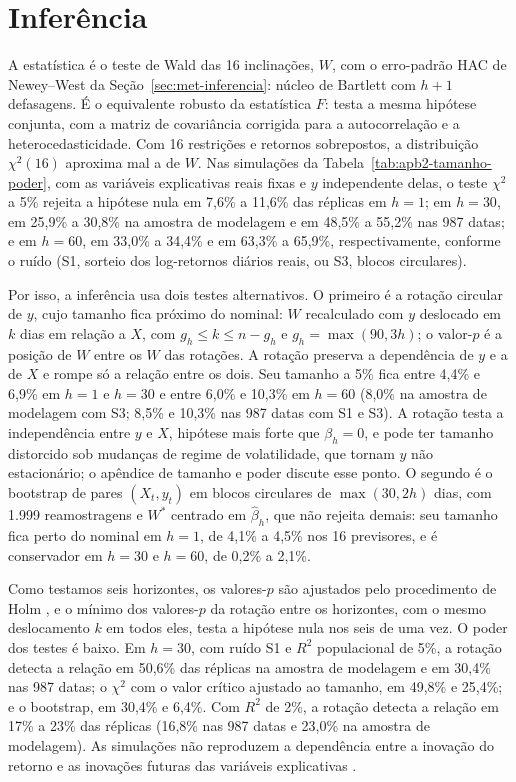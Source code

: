 \section{Inferência}
\label{sec:retlin-inferencia}

A estatística é o teste de Wald das 16 inclinações, $W$, com o erro-padrão
HAC de Newey--West da Seção~\ref{sec:met-inferencia}: núcleo de Bartlett com
$h+1$ defasagens. É o equivalente robusto da estatística $F$: testa a mesma
hipótese conjunta, com a matriz de covariância corrigida para a
autocorrelação e a heterocedasticidade. Com 16 restrições e retornos
sobrepostos, a distribuição $\chi^2(16)$ aproxima mal a de $W$. Nas simulações
da Tabela~\ref{tab:apb2-tamanho-poder}, com as variáveis explicativas reais
fixas e $y$ independente delas, o teste $\chi^2$ a 5\% rejeita a hipótese nula
em 7,6\% a 11,6\% das réplicas em $h = 1$; em $h = 30$, em 25,9\% a 30,8\% na
amostra de modelagem e em 48,5\% a 55,2\% nas 987 datas; e em $h = 60$, em
33,0\% a 34,4\% e em 63,3\% a 65,9\%, respectivamente, conforme o ruído (S1,
sorteio dos log-retornos diários reais, ou S3, blocos circulares).

Por isso, a inferência usa dois testes alternativos. O primeiro é a rotação
circular de $y$, cujo tamanho fica próximo do nominal: $W$ recalculado com $y$
deslocado em $k$ dias em relação a $X$, com $g_h \le k \le n - g_h$ e
$g_h = \max(90, 3h)$; o valor-$p$ é a posição de $W$ entre os $W$ das
rotações. A rotação preserva a dependência de $y$ e a de $X$ e rompe só a
relação entre os dois. Seu tamanho a 5\% fica entre 4,4\% e 6,9\% em $h = 1$
e $h = 30$ e entre 6,0\% e 10,3\% em $h = 60$ (8,0\% na amostra de modelagem
com S3; 8,5\% e 10,3\% nas 987 datas com S1 e S3). A rotação testa a
independência entre $y$ e $X$, hipótese mais forte que $\beta_h = 0$, e pode
ter tamanho distorcido sob mudanças de regime de volatilidade, que tornam $y$
não estacionário; o apêndice de tamanho e poder discute esse ponto. O segundo
é o bootstrap de pares $(X_t, y_t)$ em blocos circulares \citep{politis1992circular} de $\max(30, 2h)$
dias, com 1.999 reamostragens e $W^*$ centrado em $\hat\beta_h$, que não
rejeita demais: seu tamanho fica perto do nominal em $h = 1$, de 4,1\% a 4,5\%
nos 16 previsores, e é conservador em $h = 30$ e $h = 60$, de 0,2\% a 2,1\%.

Como testamos seis horizontes, os valores-$p$ são ajustados pelo
procedimento de Holm \citep{holm1979simple}, e o mínimo dos valores-$p$ da rotação entre os
horizontes, com o mesmo deslocamento $k$ em todos eles, testa a hipótese nula
nos seis de uma vez. O poder dos testes é baixo. Em $h = 30$, com ruído S1 e
$R^2$ populacional de 5\%, a rotação detecta a relação em 50,6\% das réplicas
na amostra de modelagem e em 30,4\% nas 987 datas; o $\chi^2$ com o valor
crítico ajustado ao tamanho, em 49,8\% e 25,4\%; e o bootstrap, em 30,4\% e
6,4\%. Com $R^2$ de 2\%, a rotação detecta a relação em 17\% a 23\% das
réplicas (16,8\% nas 987 datas e 23,0\% na amostra de modelagem). As
simulações não reproduzem a dependência entre a inovação do retorno e as
inovações futuras das variáveis explicativas \citep{stambaugh1999}.

